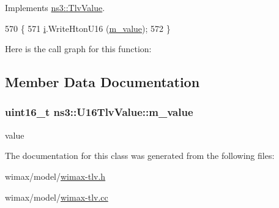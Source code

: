 Implements \hyperlink{classns3_1_1TlvValue_aeec8825728398e18337efd9cb40a2aa4}{ns3\+::\+Tlv\+Value}.


\begin{DoxyCode}
570 \{
571   \hyperlink{bernuolliDistribution_8m_a6f6ccfcf58b31cb6412107d9d5281426}{i}.WriteHtonU16 (\hyperlink{classns3_1_1U16TlvValue_a81caffd66ca36fd26cd50341e3c59dc1}{m\_value});
572 \}
\end{DoxyCode}


Here is the call graph for this function\+:




\subsection{Member Data Documentation}
\subsubsection[{\texorpdfstring{m\+\_\+value}{m_value}}]{\setlength{\rightskip}{0pt plus 5cm}uint16\+\_\+t ns3\+::\+U16\+Tlv\+Value\+::m\+\_\+value\hspace{0.3cm}{\ttfamily [private]}}\hypertarget{classns3_1_1U16TlvValue_a81caffd66ca36fd26cd50341e3c59dc1}{}\label{classns3_1_1U16TlvValue_a81caffd66ca36fd26cd50341e3c59dc1}


value 



The documentation for this class was generated from the following files\+:\begin{DoxyCompactItemize}
\item 
wimax/model/\hyperlink{wimax-tlv_8h}{wimax-\/tlv.\+h}\item 
wimax/model/\hyperlink{wimax-tlv_8cc}{wimax-\/tlv.\+cc}\end{DoxyCompactItemize}
